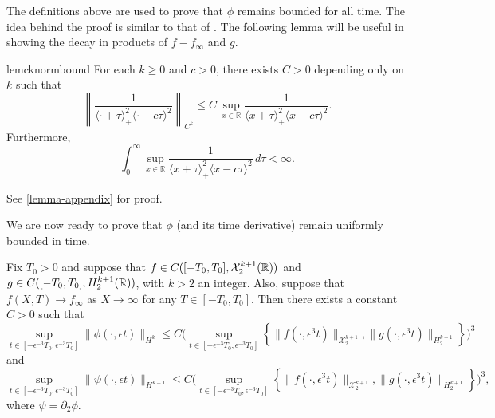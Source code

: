 The definitions above are used to prove that \(\phi\) remains bounded for all time. The idea behind the proof is similar to that of \cite[Lemma~3.1]{schneider2000counter}. The following lemma will be useful in showing the decay in products of \(f-f_\infty\) and \(g\).
\begin{restatable}{lem}{cknormbound}
	For each \(k\geq 0\) and \(c > 0\), there exists \(C> 0\) depending only on \(k\) such that 
	\begin{equation}\label{Ck-bound}
		\left \| \frac 1 {\langle \cdot +\tau\rangle_+^2 \langle \cdot - c\tau \rangle^2} \right \|_{C^k} \leq C\, \sup_{x\in\mathbb R} \frac 1 {\langle x +\tau\rangle_+^2 \langle x -c \tau \rangle^2}.
	\end{equation}
	Furthermore,
	\begin{equation}\label{sup-integrable}
		\int_0^\infty \sup_{x\in\mathbb R} \frac 1 {\langle x +\tau\rangle_+^2 \langle x -c \tau \rangle^2}\, d\tau <\infty.
	\end{equation}
\end{restatable}
See \cref{lemma-appendix} for proof. 

We are now ready to prove that \(\phi\) (and its time derivative) remain uniformly bounded in time.
\begin{prop}
	Fix \(T_0> 0\) and suppose that \(f \in C([-T_0,T_0], \mathcal{X}_2^{k+1}(\mathbb{R}))\) and \(g \in C([-T_0,T_0], H^{k+1}_2(\mathbb{R})) \), with \(k>2\) an integer. Also, suppose that \(f(X,T)\to f_\infty\) as \(X\to \infty\) for any \(T\in[-T_0,T_0]\). Then there exists a constant \(C>0\) such that 
	\begin{equation}\label{phi-bound}
		\sup_{t\in[-\epsilon^{-3}T_0,\epsilon^{-3}T_0]} \|\phi(\cdot,\epsilon t)\|_{H^k} \leq C \Bigg( \sup_{t\in[-\epsilon^{-3}T_0,\epsilon^{-3}T_0]} \left\{\| f(\cdot, \epsilon^3t) \|_{\mathcal X^{k+1}_{2}},  \| g(\cdot, \epsilon^3t) \|_{H^{k+1}_2} \right\}\Bigg)^3
	\end{equation}
	and
	\begin{equation}\label{psi-bound}
		\sup_{t\in[-\epsilon^{-3}T_0,\epsilon^{-3}T_0]} \|\psi(\cdot,\epsilon t)\|_{H^{k-1}} \leq C \Bigg( \sup_{t\in[-\epsilon^{-3}T_0,\epsilon^{-3}T_0]} \left\{\| f(\cdot, \epsilon^3t) \|_{\mathcal X^{k+1}_{2}},  \| g(\cdot, \epsilon^3t) \|_{H^{k+1}_2} \right\}\Bigg)^3,
	\end{equation}
	where \(\psi = \partial_2 \phi\).
\end{prop}

